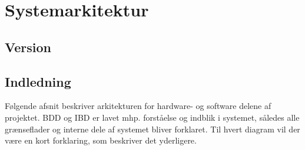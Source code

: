 \chapter{Systemarkitektur}

\section*{Version}

\section{Indledning}
Følgende afsnit beskriver arkitekturen for hardware- og software delene af projektet. BDD og IBD er lavet mhp. forståelse og indblik i systemet, således alle grænseflader og interne dele af systemet bliver forklaret. Til hvert diagram vil der være en kort forklaring, som beskriver det yderligere.




\clearpage
